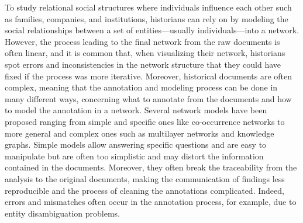 To study relational social structures where individuals influence each other such as families, companies, and institutions, historians can rely on \hsna by modeling the social relationships between a set of entities---usually individuals---into a network.
However, the process leading to the final network from the raw documents is often linear, and it is common that, when visualizing their network, historians spot errors and inconsistencies in the network structure that they could have fixed if the process was more iterative\cite{alkadi2022}.
Moreover, historical documents are often complex, meaning that the annotation and modeling process can be done in many different ways, concerning what to annotate from the documents\cite{lemercierBackSourcesPracticing2021} and how to model the annotation in a network\cite{cristofoliAuxSourcesGrands2008}.
Several network models have been proposed ranging from simple and specific ones like co-occurrence networks to more general and complex ones such as multilayer networks and knowledge graphs.
Simple models allow answering specific questions and are easy to manipulate but are often too simplistic and may distort the information contained in the documents.
Moreover, they often break the traceability from the analysis to the original documents, making the communication of findings less reproducible and the process of cleaning the annotations complicated.
Indeed, errors and mismatches often occur in the annotation process, for example, due to entity disambiguation problems\cite{diesnerImpactEntityDisambiguation2015}.
